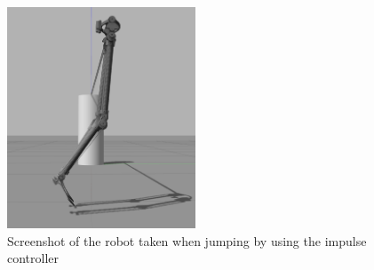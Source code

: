 
\begin{figure}[hb]
    \centering
    \includegraphics[width=0.5\textwidth]{figures/gazebo_jumping.png}
    \caption{Screenshot of the robot taken when jumping by using the impulse controller}
    \label{fig:gazebo_jumping}
\end{figure}


